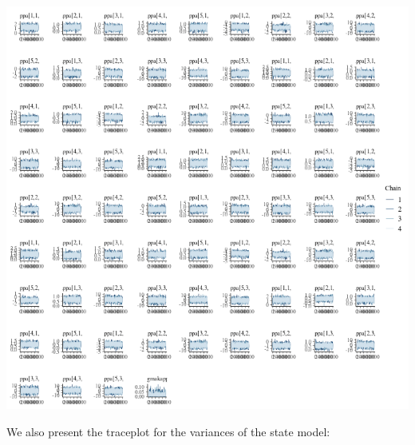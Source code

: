 \documentclass[a4paper]{article}
\newenvironment{Default Paragraph Font}{}{}
\begin{document}
\begin{knitrout}
{\centering \includegraphics[width=\linewidth,height=\linewidth]{caperpy-traceplot-kappa-1} 

}



\end{knitrout}

We also present the traceplot for the variances of the state model:
\end{document}
